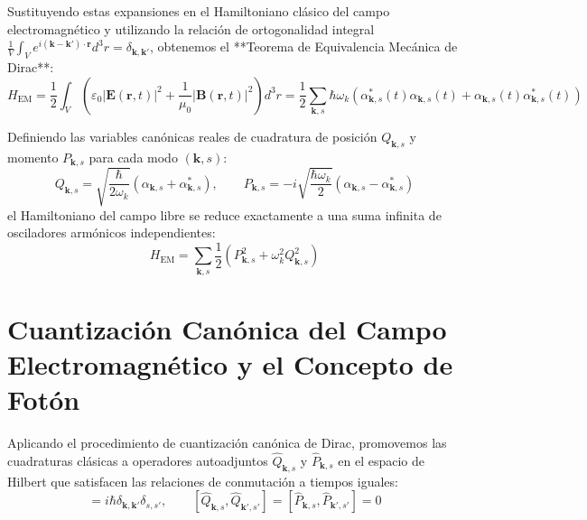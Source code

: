 \documentclass[11pt,a4paper]{book}
\begin{document}
Sustituyendo estas expansiones en el Hamiltoniano clásico del campo electromagnético y utilizando la relación de ortogonalidad integral $\frac{1}{V}\int_V e^{i(\mathbf{k}-\mathbf{k}')\cdot\mathbf{r}} d^3r = \delta_{\mathbf{k},\mathbf{k}'}$, obtenemos el **Teorema de Equivalencia Mecánica de Dirac**:
\begin{equation}
H_{\text{EM}} = \frac{1}{2} \int_V \left( \varepsilon_0 |\mathbf{E}(\mathbf{r},t)|^2 + \frac{1}{\mu_0}|\mathbf{B}(\mathbf{r},t)|^2 \right) d^3r = \frac{1}{2} \sum_{\mathbf{k}, s} \hbar \omega_k \left( \alpha_{\mathbf{k},s}^*(t)\alpha_{\mathbf{k},s}(t) + \alpha_{\mathbf{k},s}(t)\alpha_{\mathbf{k},s}^*(t) \right)
\end{equation}

Definiendo las variables canónicas reales de cuadratura de posición $Q_{\mathbf{k},s}$ y momento $P_{\mathbf{k},s}$ para cada modo $(\mathbf{k}, s)$:
\begin{equation}
Q_{\mathbf{k},s} = \sqrt{\frac{\hbar}{2\omega_k}} \left( \alpha_{\mathbf{k},s} + \alpha_{\mathbf{k},s}^* \right), \qquad P_{\mathbf{k},s} = -i\sqrt{\frac{\hbar \omega_k}{2}} \left( \alpha_{\mathbf{k},s} - \alpha_{\mathbf{k},s}^* \right)
\end{equation}
el Hamiltoniano del campo libre se reduce exactamente a una suma infinita de osciladores armónicos independientes:
\begin{equation}
H_{\text{EM}} = \sum_{\mathbf{k}, s} \frac{1}{2} \left( P_{\mathbf{k},s}^2 + \omega_k^2 Q_{\mathbf{k},s}^2 \right)
\end{equation}

\section{Cuantización Canónica del Campo Electromagnético y el Concepto de Fotón}

Aplicando el procedimiento de cuantización canónica de Dirac, promovemos las cuadraturas clásicas a operadores autoadjuntos $\hat{Q}_{\mathbf{k},s}$ y $\hat{P}_{\mathbf{k},s}$ en el espacio de Hilbert que satisfacen las relaciones de conmutación a tiempos iguales:
\begin{equation}
[\hat{Q}_{\mathbf{k},s}, \hat{P}_{\mathbf{k}',s'}] = i\hbar \delta_{\mathbf{k},\mathbf{k}'} \delta_{s,s'}, \qquad [\hat{Q}_{\mathbf{k},s}, \hat{Q}_{\mathbf{k}',s'}] = [\hat{P}_{\mathbf{k},s}, \hat{P}_{\mathbf{k}',s'}] = 0
\end{equation}
\end{document}
